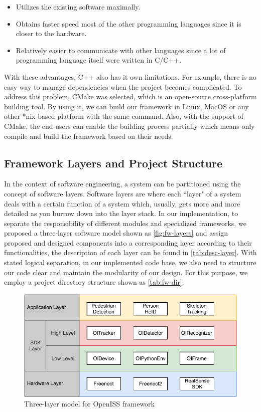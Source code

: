 \begin{itemize}
    \item Utilizes the existing software maximally.
    \item Obtains faster speed most of the other programming languages since it
    is closer to the hardware.
    \item Relatively easier to communicate with other languages since a lot of
    programming language itself were written in C/C++.
\end{itemize}

With these advantages, C++ also has it own limitations. For example, there is
no easy way to manage dependencies when the project becomes complicated.
To address this problem, CMake was selected, which is an open-source cross-platform building tool. By using it, we can build our framework in
Linux, MacOS or any other *nix-based platform with the same command.
Also, with the support of CMake, the end-users can enable the building process
partially which means only compile and build the framework based on their
needs.

\subsection{Framework Layers and Project Structure}
\label{sec:fw-inst-layer-strcut}

In the context of software engineering, a system can be partitioned using the
concept of software layers. Software layers are where each ``layer" of a system
deals with a certain function of a system which, usually, gets more and more
detailed as you burrow down into the layer stack. In our implementation, to separate the responsibility of different modules and specialized
frameworks, we proposed a three-layer software model shown as
\autoref{fig:fw-layers} and assign proposed and designed components into a
corresponding layer according to their functionalities, the description of each
layer can be found in \autoref{tab:desc-layer}. With stated logical separation,
in our implemented code base, we also need to structure our code clear and
maintain the modularity of our design. For this purpose, we employ a project
directory structure shown as \autoref{tab:fw-dir}.

\begin{figure}
    \centering
    \includegraphics[width=\linewidth]{figures/framework_inst_layers.pdf}
    \caption{Three-layer model for OpenISS framework}
    \label{fig:fw-layers}
\end{figure}

